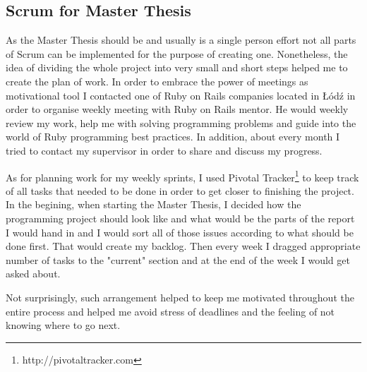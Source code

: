     \subsection{Scrum for Master Thesis}
      As the Master Thesis should be and usually is a single person effort not all parts of Scrum can be
      implemented for the purpose of creating one. Nonetheless, the idea of dividing the whole project
      into very small and short steps helped me to create the plan of work. In order to
      embrace the power of meetings as motivational tool I contacted one of Ruby on Rails companies located
      in Łódź in order to organise weekly meeting with Ruby on Rails mentor. He would weekly review my
      work, help me with solving programming problems and guide into the world of Ruby programming best practices.
      In addition, about every month I tried to contact my supervisor in order to share and discuss my progress.

      As for planning work for my weekly sprints, I used Pivotal Tracker\footnote{http://pivotaltracker.com}
      to keep track of all tasks that needed to be done in order to get closer to finishing the project.
      In the begining, when starting the Master Thesis, I decided how the programming project should look like and what
      would be the parts of the report I would hand in and I would sort all of those issues according to
      what should be done first. That would create my backlog. Then every week I dragged appropriate number of tasks
      to the "current" section and at the end of the week I would get asked about.

      Not surprisingly, such arrangement helped to keep me motivated throughout the entire process and
      helped me avoid stress of deadlines and the feeling of not knowing where to go next.



